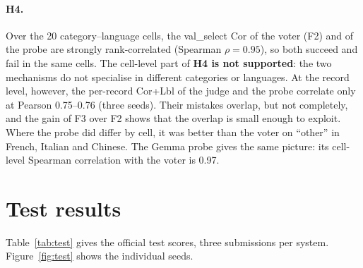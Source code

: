 \paragraph{H4.}
Over the 20 category--language cells, the val\_select Cor of the voter (F2) and of the probe are strongly rank-correlated (Spearman $\rho = 0.95$), so both succeed and fail in the same cells. The cell-level part of \textbf{H4 is not supported}: the two mechanisms do not specialise in different categories or languages. At the record level, however, the per-record Cor+Lbl of the judge and the probe correlate only at Pearson 0.75--0.76 (three seeds). Their mistakes overlap, but not completely, and the gain of F3 over F2 shows that the overlap is small enough to exploit. Where the probe did differ by cell, it was better than the voter on ``other'' in French, Italian and Chinese. The Gemma probe gives the same picture: its cell-level Spearman correlation with the voter is 0.97.

\section{Test results}\label{sec:exp-test}

Table~\ref{tab:test} gives the official test scores, three submissions per system. Figure~\ref{fig:test} shows the individual seeds.

\begin{table}[!htb]
    \centering
    \caption{Official test results (mean $\pm$ s.d.\ over three seeds; one submission per seed). The shared-task entry is our submission to the competition (solution 02, one seed).}
    \label{tab:test}
\end{table}

